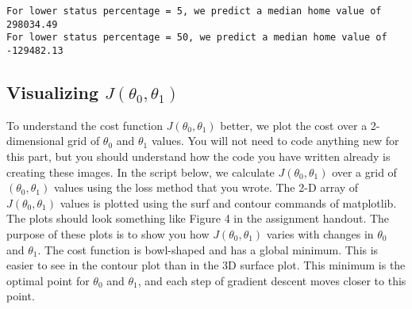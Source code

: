 \documentclass[11pt]{article}
\begin{document}
    \begin{Verbatim}[commandchars=\\\{\}]
For lower status percentage = 5, we predict a median home value of 298034.49
For lower status percentage = 50, we predict a median home value of -129482.13

    \end{Verbatim}

    \subsection{\texorpdfstring{Visualizing
\(J(\theta_0,\theta_1)\)}{Visualizing J(\textbackslash{}theta\_0,\textbackslash{}theta\_1)}}\label{visualizing-jtheta_0theta_1}

To understand the cost function \(J(\theta_0,\theta_1)\) better, we plot
the cost over a 2-dimensional grid of \(\theta_0\) and \(\theta_1\)
values. You will not need to code anything new for this part, but you
should understand how the code you have written already is creating
these images. In the script below, we calculate \(J(\theta_0,\theta_1)\)
over a grid of \((\theta_0,\theta_1)\) values using the loss method that
you wrote. The 2-D array of \(J(\theta_0,\theta_1)\) values is plotted
using the surf and contour commands of matplotlib. The plots should look
something like Figure 4 in the assignment handout. The purpose of these
plots is to show you how \(J(\theta_0,\theta_1)\) varies with changes in
\(\theta_0\) and \(\theta_1\). The cost function is bowl-shaped and has
a global minimum. This is easier to see in the contour plot than in the
3D surface plot. This minimum is the optimal point for \(\theta_0\) and
\(\theta_1\), and each step of gradient descent moves closer to this
point.
\end{document}

